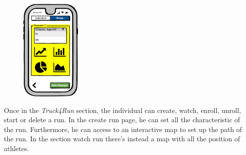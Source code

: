 \documentclass[a4paper]{article}
\begin{document}
\begin{figure}[!htpb]
     	\includegraphics[height=50mm]{images/mockups/ViewData2.png}		
         \end{figure}
        
Once in the \textit{Truck4Run} section, the individual can create, watch, enroll, unroll, start or delete a run.  In the create run page, he can set all the characteristic of the run. Furthermore, he can access to an interactive map to set up the path of the run. In the section watch run there's instead a map with all the position of athletes.
\end{document}
